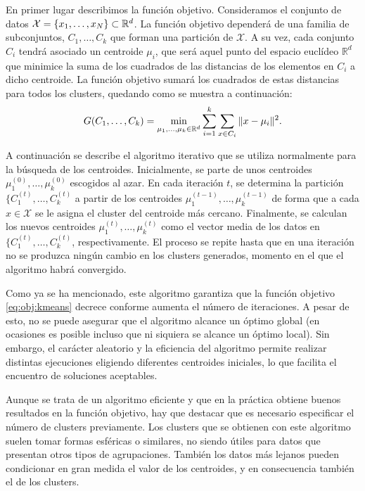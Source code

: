 \documentclass{book}
\begin{document}
En primer lugar describimos la función objetivo. Consideramos el conjunto de datos $\mathcal{X} = \{x_1,\dots,x_N\} \subset \mathbb{R}^d$. La función objetivo dependerá de una familia de subconjuntos, $C_1,\dots,C_k$ que forman una partición de $\mathcal{X}$. A su vez, cada conjunto $C_i$ tendrá asociado un centroide $\mu_i$, que será aquel punto del espacio euclídeo $\mathbb{R}^d$ que minimice la suma de los cuadrados de las distancias de los elementos en $C_i$ a dicho centroide.  La función objetivo sumará los cuadrados de estas distancias para todos los clusters, quedando como se muestra a continuación:
\begin{equation} \label{eq:obj:kmeans}
	G(C_1,\dots,C_k) = \min_{\mu_1,\dots,\mu_k \in \mathbb{R}^d} \sum_{i=1}^{k}\sum_{x\in C_i} \|x-\mu_i\|^2.
\end{equation}

A continuación se describe el algoritmo iterativo que se utiliza normalmente para la búsqueda de los centroides. Inicialmente, se parte de unos centroides $\mu_1^{(0)},\dots,\mu_k^{(0)}$ escogidos al azar. En cada iteración $t$, se determina la partición $\{C_1^{(t)},\dots,C_k^{(t)}$ a partir de los centroides $\mu_1^{(t-1)},\dots,\mu_k^{(t-1)}$ de forma que a cada $x \in \mathcal{X}$ se le asigna el cluster del centroide más cercano. Finalmente, se calculan los nuevos centroides $\mu_1^{(t)},\dots,\mu_k^{(t)}$ como el vector media de los datos en $\{C_1^{(t)},\dots,C_k^{(t)}$, respectivamente. El proceso se repite hasta que en una iteración no se produzca ningún cambio en los clusters generados, momento en el que el algoritmo habrá convergido.

Como ya se ha mencionado, este algoritmo garantiza que la función objetivo \ref{eq:obj:kmeans} decrece conforme aumenta el número de iteraciones. A pesar de esto, no se puede asegurar que el algoritmo alcance un óptimo global (en ocasiones es posible incluso que ni siquiera se alcance un óptimo local). Sin embargo, el carácter aleatorio y la eficiencia del algoritmo permite realizar distintas ejecuciones eligiendo diferentes centroides iniciales, lo que facilita el encuentro de soluciones aceptables. 

Aunque se trata de un algoritmo eficiente y que en la práctica obtiene buenos resultados en la función objetivo, hay que destacar que es necesario especificar el número de clusters previamente. Los clusters que se obtienen con este algoritmo suelen tomar formas esféricas o similares, no siendo útiles para datos que presentan otros tipos de agrupaciones. También los datos más lejanos pueden condicionar en gran medida el valor de los centroides, y en consecuencia también el de los clusters.
\end{document}

